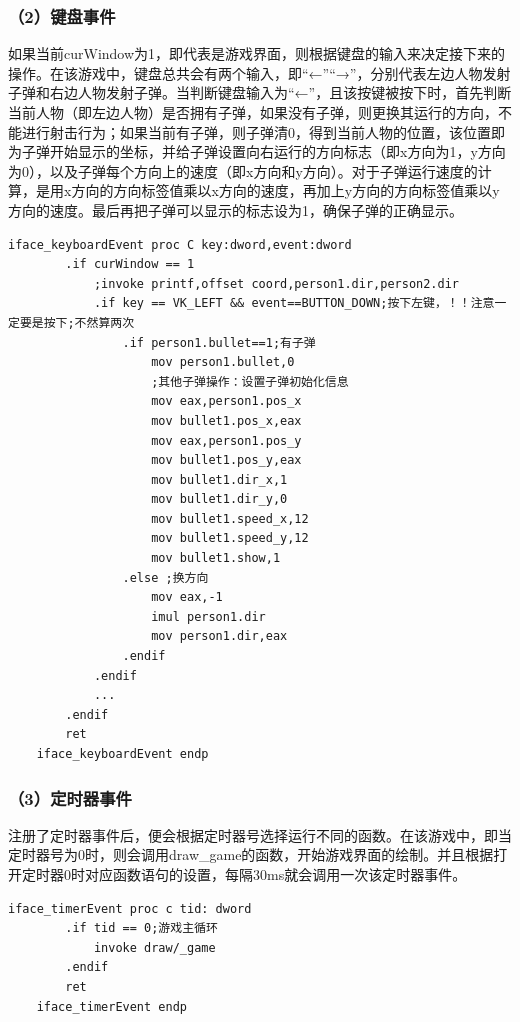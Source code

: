 \subsubsection{（2）键盘事件}
如果当前curWindow为1，即代表是游戏界面，则根据键盘的输入来决定接下来的操作。在该游戏中，键盘总共会有两个输入，即“←”“→”，分别代表左边人物发射子弹和右边人物发射子弹。当判断键盘输入为“←”，且该按键被按下时，首先判断当前人物（即左边人物）是否拥有子弹，如果没有子弹，则更换其运行的方向，不能进行射击行为；如果当前有子弹，则子弹清0，得到当前人物的位置，该位置即为子弹开始显示的坐标，并给子弹设置向右运行的方向标志（即x方向为1，y方向为0），以及子弹每个方向上的速度（即x方向和y方向）。对于子弹运行速度的计算，是用x方向的方向标签值乘以x方向的速度，再加上y方向的方向标签值乘以y方向的速度。最后再把子弹可以显示的标志设为1，确保子弹的正确显示。
\begin{lstlisting}[language={[x86masm]Assembler}]
    iface_keyboardEvent proc C key:dword,event:dword
        .if curWindow == 1
            ;invoke printf,offset coord,person1.dir,person2.dir
            .if key == VK_LEFT && event==BUTTON_DOWN;按下左键，！！注意一定要是按下;不然算两次
                .if person1.bullet==1;有子弹
                    mov person1.bullet,0
                    ;其他子弹操作：设置子弹初始化信息
                    mov eax,person1.pos_x
                    mov bullet1.pos_x,eax
                    mov eax,person1.pos_y
                    mov bullet1.pos_y,eax
                    mov bullet1.dir_x,1
                    mov bullet1.dir_y,0
                    mov bullet1.speed_x,12
                    mov bullet1.speed_y,12
                    mov bullet1.show,1
                .else ;换方向
                    mov eax,-1
                    imul person1.dir
                    mov person1.dir,eax
                .endif
            .endif
            ...
        .endif
        ret
    iface_keyboardEvent endp
\end{lstlisting}
\subsubsection{（3）定时器事件}
注册了定时器事件后，便会根据定时器号选择运行不同的函数。在该游戏中，即当定时器号为0时，则会调用draw\_game的函数，开始游戏界面的绘制。并且根据打开定时器0时对应函数语句的设置，每隔30ms就会调用一次该定时器事件。
\begin{lstlisting}[language={[x86masm]Assembler}]
    iface_timerEvent proc c tid: dword
        .if tid == 0;游戏主循环
            invoke draw/_game
        .endif
        ret
    iface_timerEvent endp
\end{lstlisting}
